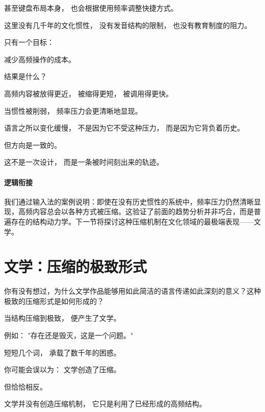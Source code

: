 \documentclass[openany, a4paper, 12pt]{book}
\begin{document}
甚至键盘布局本身，
也会根据使用频率调整快捷方式。

这里没有几千年的文化惯性，
没有发音结构的限制，
也没有教育制度的阻力。

只有一个目标：

减少高频操作的成本。

结果是什么？

高频内容被放得更近，
被缩得更短，
被调用得更快。

\begin{readingnote}
	当惯性被削弱，
	频率压力会更清晰地显现。
\end{readingnote}

语言之所以变化缓慢，
不是因为它不受这种压力，
而是因为它背负着历史。

但方向是一致的。

这不是一次设计，
而是一条被时间刻出来的轨迹。

\paragraph*{逻辑衔接}
我们通过输入法的案例说明：即使在没有历史惯性的系统中，频率压力仍然清晰显现，高频内容总会以各种方式被压缩。这验证了前面的趋势分析并非巧合，而是普遍存在的结构动力学。下一节将探讨这种压缩机制在文化领域的最极端表现——文学。


\section{文学：压缩的极致形式}

\begin{questionbox}
	你有没有想过，为什么文学作品能够用如此简洁的语言传递如此深刻的意义？这种极致的压缩形式是如何形成的？
\end{questionbox}

当结构压缩到极致，
便产生了文学。

例如：
"存在还是毁灭，这是一个问题。"

短短几个词，
承载了数千年的困惑。

\begin{tcolorbox}[colback=yellow!5,title=\textit{读者行为预测}]
	你可能会误以为：
	文学创造了压缩。

	但恰恰相反。
\end{tcolorbox}

文学并没有创造压缩机制，
它只是利用了已经形成的高频结构。
\end{document}
